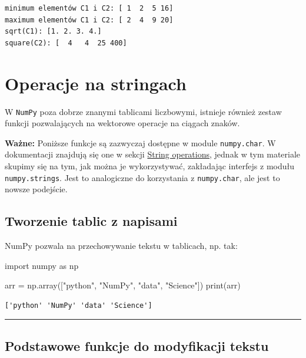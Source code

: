 \documentclass[
  polish,
  letterpaper,
  DIV=11,
  numbers=noendperiod]{scrreprt}
\newenvironment{Shaded}{\begin{snugshade}}{\end{snugshade}}
\newcommand{\BuiltInTok}[1]{\textcolor[rgb]{0.00,0.23,0.31}{#1}}
\newcommand{\ImportTok}[1]{\textcolor[rgb]{0.00,0.46,0.62}{#1}}
\newcommand{\NormalTok}[1]{\textcolor[rgb]{0.00,0.23,0.31}{#1}}
\newcommand{\OperatorTok}[1]{\textcolor[rgb]{0.37,0.37,0.37}{#1}}
\newcommand{\StringTok}[1]{\textcolor[rgb]{0.13,0.47,0.30}{#1}}
\begin{document}
\begin{verbatim}
minimum elementów C1 i C2: [ 1  2  5 16]
maximum elementów C1 i C2: [ 2  4  9 20]
sqrt(C1): [1. 2. 3. 4.]
square(C2): [  4   4  25 400]
\end{verbatim}

\chapter{Operacje na stringach}\label{operacje-na-stringach}

W \texttt{NumPy} poza dobrze znanymi tablicami liczbowymi, istnieje
również zestaw funkcji pozwalających na wektorowe operacje na ciągach
znaków.

\textbf{Ważne:} Poniższe funkcje są zazwyczaj dostępne w module
\texttt{numpy.char}. W dokumentacji znajdują się one w sekcji
\href{https://numpy.org/doc/stable/reference/routines.strings.html}{String
operations}, jednak w tym materiale skupimy się na tym, jak można je
wykorzystywać, zakładając interfejs z modułu \texttt{numpy.strings}.
Jest to analogiczne do korzystania z \texttt{numpy.char}, ale jest to
nowsze podejście.

\section{Tworzenie tablic z napisami}\label{tworzenie-tablic-z-napisami}

NumPy pozwala na przechowywanie tekstu w tablicach, np. tak:

\begin{Shaded}
\begin{Highlighting}[]
\ImportTok{import}\NormalTok{ numpy }\ImportTok{as}\NormalTok{ np}

\NormalTok{arr }\OperatorTok{=}\NormalTok{ np.array([}\StringTok{"python"}\NormalTok{, }\StringTok{"NumPy"}\NormalTok{, }\StringTok{"data"}\NormalTok{, }\StringTok{"Science"}\NormalTok{])}
\BuiltInTok{print}\NormalTok{(arr)}
\end{Highlighting}
\end{Shaded}

\begin{verbatim}
['python' 'NumPy' 'data' 'Science']
\end{verbatim}

\begin{center}\rule{0.5\linewidth}{0.5pt}\end{center}

\section{Podstawowe funkcje do modyfikacji
tekstu}\label{podstawowe-funkcje-do-modyfikacji-tekstu}
\end{document}
